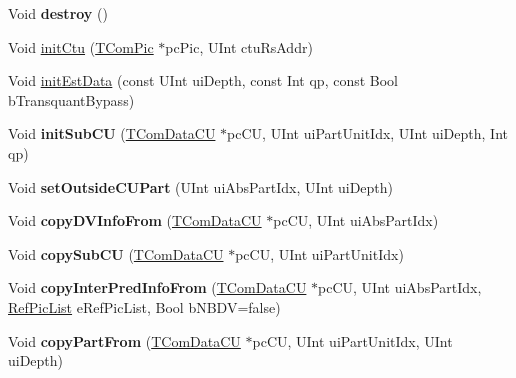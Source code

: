 \begin{DoxyCompactItemize}
Void {\bfseries destroy} ()
\item 
Void \hyperlink{class_t_com_data_c_u_ad5fda1e6ae341e2bbe617a4a1743b72e}{init\+Ctu} (\hyperlink{class_t_com_pic}{T\+Com\+Pic} $\ast$pc\+Pic, U\+Int ctu\+Rs\+Addr)
\item 
Void \hyperlink{class_t_com_data_c_u_aedc8736217f3c4bb6056748fe57f932f}{init\+Est\+Data} (const U\+Int ui\+Depth, const Int qp, const Bool b\+Transquant\+Bypass)
\item 
\mbox{\label{class_t_com_data_c_u_a586bc93734fc92aa8d2dc66b3f74e2dd}} 
Void {\bfseries init\+Sub\+CU} (\hyperlink{class_t_com_data_c_u}{T\+Com\+Data\+CU} $\ast$pc\+CU, U\+Int ui\+Part\+Unit\+Idx, U\+Int ui\+Depth, Int qp)
\item 
\mbox{\label{class_t_com_data_c_u_a5feee1eed9f4aaa278747703c7625296}} 
Void {\bfseries set\+Outside\+C\+U\+Part} (U\+Int ui\+Abs\+Part\+Idx, U\+Int ui\+Depth)
\item 
\mbox{\label{class_t_com_data_c_u_a3460ba31498feb63d585b4cdfa3ae39d}} 
Void {\bfseries copy\+D\+V\+Info\+From} (\hyperlink{class_t_com_data_c_u}{T\+Com\+Data\+CU} $\ast$pc\+CU, U\+Int ui\+Abs\+Part\+Idx)
\item 
\mbox{\label{class_t_com_data_c_u_af9d96274409c76b3d3331e66cdb7112a}} 
Void {\bfseries copy\+Sub\+CU} (\hyperlink{class_t_com_data_c_u}{T\+Com\+Data\+CU} $\ast$pc\+CU, U\+Int ui\+Part\+Unit\+Idx)
\item 
\mbox{\label{class_t_com_data_c_u_aa834f9a0b98931b309f2970f188885da}} 
Void {\bfseries copy\+Inter\+Pred\+Info\+From} (\hyperlink{class_t_com_data_c_u}{T\+Com\+Data\+CU} $\ast$pc\+CU, U\+Int ui\+Abs\+Part\+Idx, \hyperlink{_type_def_8h_a93cea48eb9dcfd661168dee82e41b384}{Ref\+Pic\+List} e\+Ref\+Pic\+List, Bool b\+N\+B\+DV=false)
\item 
\mbox{\label{class_t_com_data_c_u_a83af6d60676f83d0813ab5f80f73eb4c}} 
Void {\bfseries copy\+Part\+From} (\hyperlink{class_t_com_data_c_u}{T\+Com\+Data\+CU} $\ast$pc\+CU, U\+Int ui\+Part\+Unit\+Idx, U\+Int ui\+Depth)
\item 
\mbox{\label{class_t_com_data_c_u_a0a08570c65bac6a778df0f0b886e0e98}} 

\end{DoxyCompactItemize}
